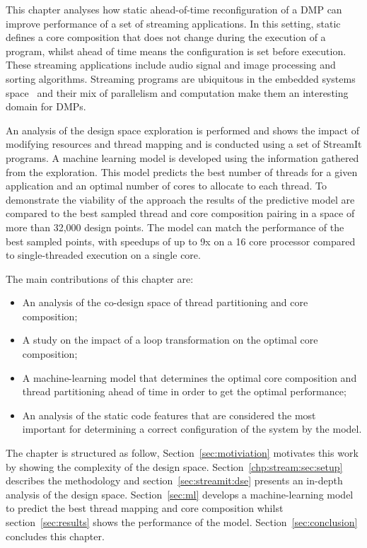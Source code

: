 This chapter analyses how static ahead-of-time reconfiguration of a DMP can improve performance of a set of streaming applications.
In this setting, static defines a core composition that does not change during the execution of a program, whilst ahead of time means the configuration is set before execution.
These streaming applications include audio signal and image processing and sorting algorithms.
Streaming programs are ubiquitous in the embedded systems space~\cite{theis2002streamit} and their mix of parallelism and computation make them an interesting domain for DMPs.

An analysis of the design space exploration is performed and shows the impact of modifying resources and thread mapping and is conducted using a set of StreamIt programs.
A machine learning model is developed using the information gathered from the exploration.
This model predicts the best number of threads for a given application and an optimal number of cores to allocate to each thread.
To demonstrate the viability of the approach the results of the predictive model are compared to the best sampled thread and core composition pairing in a space of more than 32,000 design points.
The model can match the performance of the best sampled points, with speedups of up to 9x on a 16 core processor compared to single-threaded execution on a single core. 

The main contributions of this chapter are:
\vspace{-1em}
\begin{itemize}
\item An analysis of the co-design space of thread partitioning and core composition;
\vspace{-1em}
\item A study on the impact of a loop transformation on the optimal core composition;
\vspace{-2em}
\item A machine-learning model that determines the optimal core composition and thread partitioning ahead of time in order to get the optimal performance;
\vspace{-1em}
\item An analysis of the static code features that are considered the most important for determining a correct configuration of the system by the model.
\end{itemize}


The chapter is structured as follow,
Section~\ref{sec:motiviation} motivates this work by showing the complexity of the design space.
Section~\ref{chp:stream:sec:setup} describes the methodology and section~\ref{sec:streamit:dse} presents an in-depth analysis of the design space.
Section~\ref{sec:ml} develops a machine-learning model to predict the best thread mapping and core composition whilst section~\ref{sec:results} shows the performance of the model.
Section~\ref{sec:conclusion} concludes this chapter.

